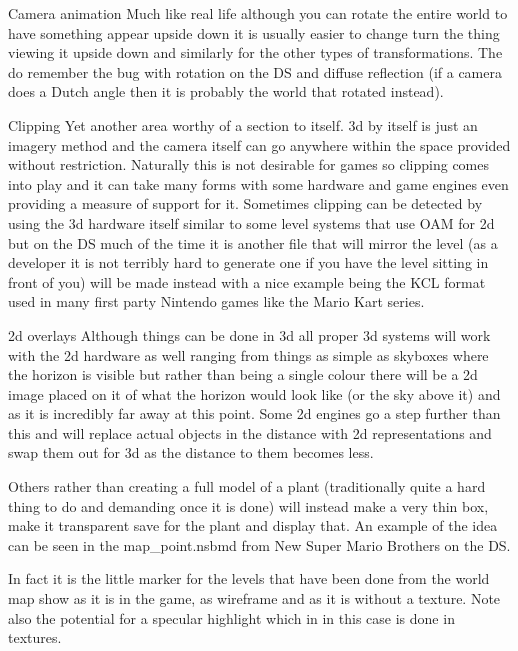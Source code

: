 \documentclass[
]{book}
\begin{document}
Camera animation Much like real life although you can rotate the entire world to have something appear upside down it is usually easier to change turn the thing viewing it upside down and similarly for the other types of transformations. The do remember the bug with rotation on the DS and diffuse reflection (if a camera does a Dutch angle then it is probably the world that rotated instead).

Clipping Yet another area worthy of a section to itself. 3d by itself is just an imagery method and the camera itself can go anywhere within the space provided without restriction. Naturally this is not desirable for games so clipping comes into play and it can take many forms with some hardware and game engines even providing a measure of support for it. Sometimes clipping can be detected by using the 3d hardware itself similar to some level systems that use OAM for 2d but on the DS much of the time it is another file that will mirror the level (as a developer it is not terribly hard to generate one if you have the level sitting in front of you) will be made instead with a nice example being the KCL format used in many first party Nintendo games like the Mario Kart series.

2d overlays Although things can be done in 3d all proper 3d systems will work with the 2d hardware as well ranging from things as simple as skyboxes where the horizon is visible but rather than being a single colour there will be a 2d image placed on it of what the horizon would look like (or the sky above it) and as it is incredibly far away at this point. Some 2d engines go a step further than this and will replace actual objects in the distance with 2d representations and swap them out for 3d as the distance to them becomes less.

Others rather than creating a full model of a plant (traditionally quite a hard thing to do and demanding once it is done) will instead make a very thin box, make it transparent save for the plant and display that. An example of the idea can be seen in the map\_point.nsbmd from New Super Mario Brothers on the DS.

In fact it is the little marker for the levels that have been done from the world map show as it is in the game, as wireframe and as it is without a texture. Note also the potential for a specular highlight which in in this case is done in textures.
\end{document}
